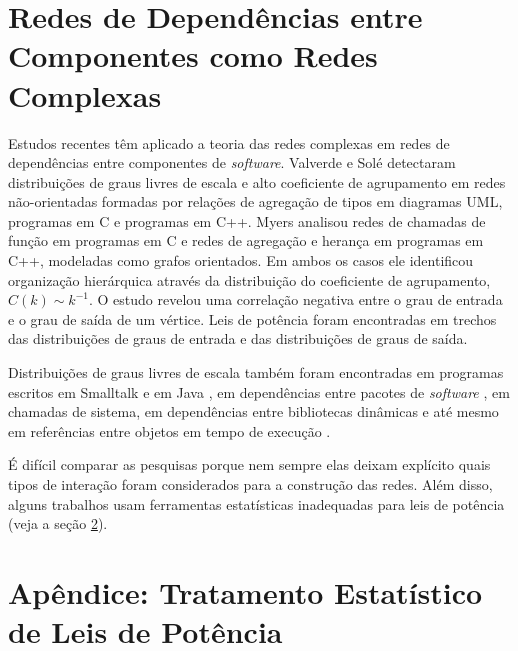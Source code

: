 \documentclass{article}
\begin{document}

\section{Redes de Dependências entre Componentes como Redes Complexas}

Estudos recentes têm aplicado a teoria das redes complexas em redes de dependências entre componentes de \textit{software}. Valverde e Solé \cite{Valverde2003} detectaram distribuições de graus livres de escala e alto coeficiente de agrupamento em redes não-orientadas formadas por relações de agregação de tipos em diagramas UML, programas em C e programas em C++. Myers \cite{Myers2003} analisou redes de chamadas de função em programas em C e redes de agregação e herança em programas em C++, modeladas como grafos orientados. Em ambos os casos ele identificou organização hierárquica através da distribuição do coeficiente de agrupamento, $C(k) \sim k^{-1}$. O estudo revelou uma correlação negativa entre o grau de entrada e o grau de saída de um vértice. Leis de potência foram encontradas em trechos das distribuições de graus de entrada e das distribuições de graus de saída.

Distribuições de graus livres de escala também foram encontradas em programas escritos em Smalltalk \cite{Marchesi2004,Concas2007} e em Java \cite{Hyland-Wood2006,Baxter2006,Ichii2008}, em dependências entre pacotes de \textit{software} \cite{Labelle2004}, em chamadas de sistema, em dependências entre bibliotecas dinâmicas \cite{Louridas2008} e até mesmo em referências entre objetos em tempo de execução \cite{Potanin2005}.

É difícil comparar as pesquisas porque nem sempre elas deixam explícito quais tipos de interação foram considerados para a construção das redes. Além disso, alguns trabalhos usam ferramentas estatísticas inadequadas para leis de potência (veja a seção \ref{sec:estatistica}).


\section{Apêndice: Tratamento Estatístico de Leis de Potência} \label{sec:estatistica}
\end{document}
